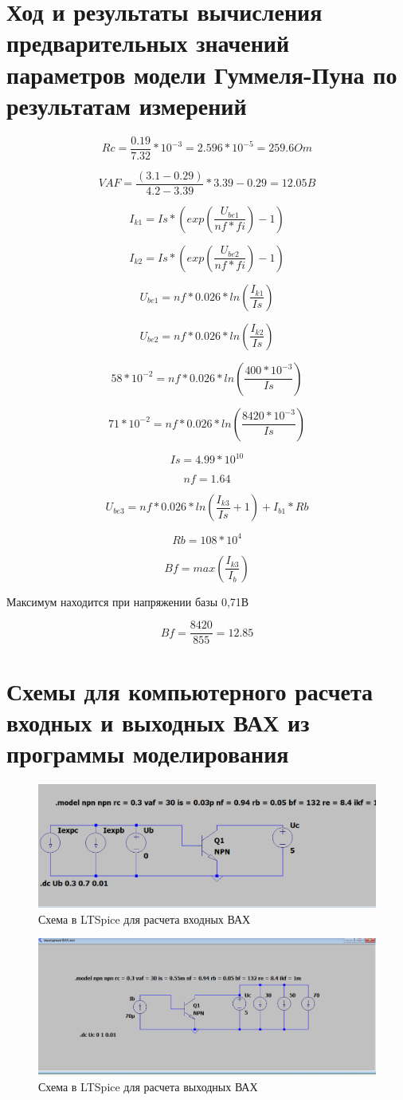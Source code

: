 \documentclass[a4paper,14pt]{article}
\begin{document}
\section{ Ход и результаты вычисления предварительных значений параметров модели Гуммеля-Пуна по результатам измерений}

$$Rc = \dfrac{0.19}{7.32} * 10^{-3} = 2.596 * 10^{-5} = 259.6Om$$

$$VAF = \dfrac{(3.1 - 0.29)}{4.2 - 3.39} * 3.39 - 0.29 = 12.05B$$ 
 
$$I_{k1} = Is * (exp(\dfrac{U_{be1}}{ nf * fi}) - 1)$$

$$I_{k2} = Is * (exp(\dfrac{U_{be2}}{ nf * fi}) - 1)$$

$$U_{be1} = nf * 0.026 * ln(\dfrac{I_{k1}}{Is})$$

$$U_{be2} = nf * 0.026 * ln(\dfrac{I_{k2}}{Is})$$

$$58 * 10^{-2} = nf * 0.026* ln(\dfrac{400 * 10^{-3}}{Is})$$

$$71 * 10^{-2} = nf * 0.026* ln(\dfrac{8420 * 10^{-3}}{Is})$$

$$Is = 4.99 * 10^{10}$$

$$nf = 1.64$$

$$U_{be3} = nf * 0.026 * ln(\dfrac{I_{k3}}{Is} + 1) + I_{b1} * Rb$$

$$Rb = 108 * 10^4$$

$$Bf = max(\dfrac{I_{k3}}{I_b})$$

Максимум находится при напряжении базы 0,71В

$$Bf = \dfrac{8420}{855} = 12.85$$

\section{Схемы для компьютерного расчета входных и выходных  ВАХ из программы моделирования}

\begin{figure}[H]
	\centering
	\includegraphics[width=0.7\linewidth]{images/shema1}
	\caption{Схема в LTSpice для расчета входных ВАХ}
	\label{fig:shema1}
\end{figure}

\begin{figure}[H]
	\centering
	\includegraphics[width=0.7\linewidth]{images/shema2}
	\caption{Схема в LTSpice для расчета выходных ВАХ}
	\label{fig:shema2}
\end{figure}
\end{document}
